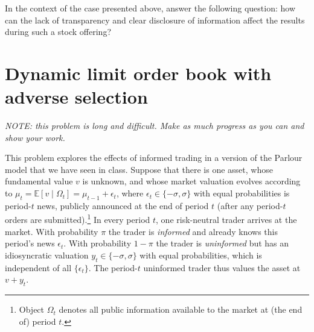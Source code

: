 \documentclass[a4paper]{article}
\newif\ifsolutions
\begin{document}
	In the context of the case presented above, answer the following question:
	how can the lack of transparency and clear disclosure of information affect the results during such a stock offering?


\ifsolutions
\subsection*{Solution}
	We have seen in class that transparency typically benefits the uninformed and harms the informed investors, since it partly negates the informational advantage that the latter have. If the effect on the uninformed investors dominates, their reduced willingness to participate in non-transparent public offerings leads to lower prices and thus lower revenue for the seller.
	
	If the market is mainly driven by the informed investors, they would be more willing to participate in an opaque auction. This is not necessarily better for the seller, since the informed traders' profit comes at a cost to both the uninformed traders and the seller (assuming the seller is uninformed; this seller's loss can be missed from only looking at competitive dealer markets, which we did throughout the course, and which does not apply to the situation at hand). So in the end, opaqueness likely harms the seller regardless of the composition of the buyer population.
\fi




\section{Dynamic limit order book with adverse selection}

	\emph{NOTE: this problem is long and difficult. Make as much progress as you can and show your work.}
	
	This problem explores the effects of informed trading in a version of the Parlour model that we have seen in class.
	Suppose that there is one asset, whose fundamental value $v$ is unknown, and whose market valuation evolves according to $\mu_t = \mathbb{E}[v \mid \Omega_t] = \mu_{t-1} + \epsilon_t$, where $\epsilon_t \in \{-\sigma, \sigma\}$ with equal probabilities is period-$t$ news, publicly announced at the end of period $t$ (after any period-$t$ orders are submitted).\footnote{Object $\Omega_t$ denotes all public information available to the market at (the end of) period $t$.} 
	In every period $t$, one risk-neutral trader arrives at the market. With probability $\pi$ the trader is \emph{informed} and already knows this period's news $\epsilon_t$. With probability $1-\pi$ the trader is \emph{uninformed} but has an idiosyncratic valuation $y_t \in \{-\sigma, \sigma\}$ with equal probabilities, which is independent of all $\{\epsilon_t\}$. The period-$t$ uninformed trader thus values the asset at $v+y_t$.
	
\end{document}
